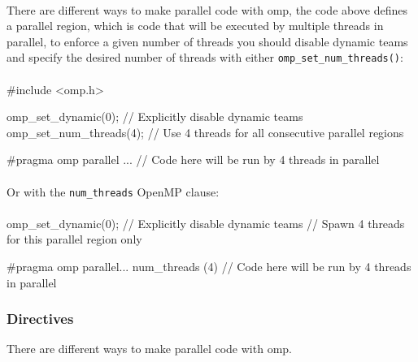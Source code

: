 \paragraph{}
There are different ways to make parallel code with omp, the code above defines a parallel region, which is code that will be executed by multiple threads in parallel, to enforce a given number of threads you should disable dynamic teams and specify the desired number of threads with either \verb|omp_set_num_threads()|:
\paragraph{}
\begin{codeInC}
#include <omp.h>

omp_set_dynamic(0);     // Explicitly disable dynamic teams
omp_set_num_threads(4); // Use 4 threads for all consecutive parallel regions

#pragma omp parallel ...
{
  // Code here will be run by 4 threads in parallel
}


\end{codeInC}
\paragraph{}
Or with the \verb|num_threads| OpenMP clause:
\paragraph{}
\begin{codeInC}
omp_set_dynamic(0);     // Explicitly disable dynamic teams
// Spawn 4 threads for this parallel region only

#pragma omp parallel... num_threads (4)
{
  // Code here will be run by 4 threads in parallel
}

\end{codeInC}

\newpage
\subsubsection{Directives}
There are different ways to make parallel code with omp.

